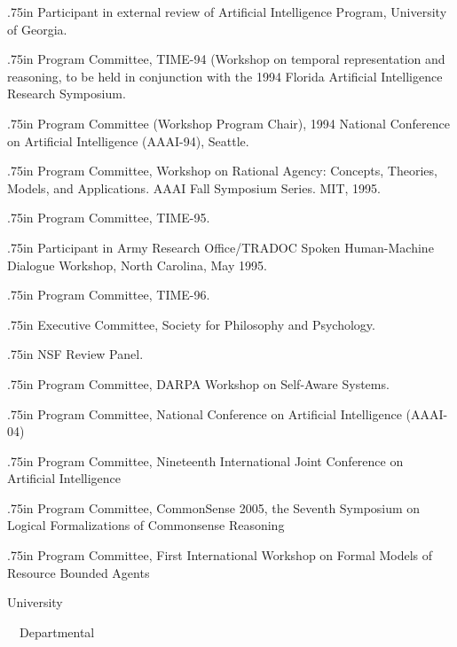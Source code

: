 { {.75in}
Participant in external review of Artificial Intelligence Program,
University of Georgia.

 {.75in}
Program Committee, TIME-94 (Workshop on temporal representation and
reasoning, to be held in conjunction with the 1994 Florida Artificial
Intelligence Research Symposium.

 {.75in}
Program Committee (Workshop Program Chair), 1994 National Conference
on Artificial Intelligence (AAAI-94), Seattle.

 {.75in}
Program Committee, Workshop on Rational Agency: Concepts, Theories,
Models, and Applications. AAAI Fall Symposium Series. MIT, 1995.

 {.75in}
Program Committee, TIME-95.

 {.75in}
Participant in Army Research Office/TRADOC Spoken Human-Machine
Dialogue Workshop, North Carolina, May 1995.

 {.75in}
Program Committee, TIME-96.

 {.75in}
Executive Committee, Society for Philosophy and Psychology.

 {.75in}
NSF Review Panel.

 {.75in}
Program Committee, DARPA Workshop on Self-Aware Systems.

 {.75in}
Program Committee, 
National Conference on Artificial Intelligence (AAAI-04)

 {.75in}
Program Committee, Nineteenth International Joint Conference on
Artificial Intelligence

 {.75in}
Program Committee, CommonSense 2005, the Seventh Symposium on Logical
Formalizations of Commonsense Reasoning

 {.75in}
Program Committee, First International Workshop on Formal Models of
Resource Bounded Agents

\subsec University

\subsubsec ~~Departmental

}
